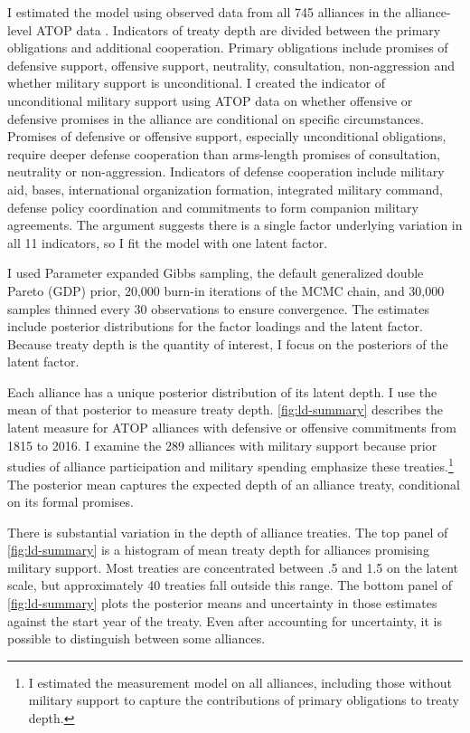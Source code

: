 \documentclass[12pt]{article}
\begin{document}
I estimated the model using observed data from all 745 alliances in the alliance-level ATOP data \citep{Leedsetal2002}. 
Indicators of treaty depth are divided between the primary obligations and additional cooperation.
Primary obligations include promises of defensive support, offensive support, neutrality, consultation, non-aggression and whether military support is unconditional. 
I created the indicator of unconditional military support using ATOP data on whether offensive or defensive promises in the alliance are conditional on specific circumstances. 
Promises of defensive or offensive support, especially unconditional obligations, require deeper defense cooperation than arms-length promises of consultation, neutrality or non-aggression. 
Indicators of defense cooperation include military aid, bases, international organization formation, integrated military command, defense policy coordination and commitments to form companion military agreements. 
The argument suggests there is a single factor underlying variation in all 11 indicators, so I fit the model with one latent factor. 


I used Parameter expanded Gibbs sampling, the default generalized double Pareto (GDP) prior, 20,000 burn-in iterations of the MCMC chain, and 30,000 samples thinned every 30 observations to ensure convergence. 
The estimates include posterior distributions for the factor loadings and the latent factor. 
Because treaty depth is the quantity of interest, I focus on the posteriors of the latent factor. 


Each alliance has a unique posterior distribution of its latent depth. 
I use the mean of that posterior to measure treaty depth. 
\autoref{fig:ld-summary} describes the latent measure for ATOP alliances with defensive or offensive commitments from 1815 to 2016.
I examine the 289 alliances with military support because prior studies of alliance participation and military spending emphasize these treaties.\footnote{
I estimated the measurement model on all alliances, including those without military support to capture the contributions of primary obligations to treaty depth.}
The posterior mean captures the expected depth of an alliance treaty, conditional on its formal promises. 


There is substantial variation in the depth of alliance treaties. 
The top panel of \autoref{fig:ld-summary} is a histogram of mean treaty depth for alliances promising military support.  
Most treaties are concentrated between .5 and 1.5 on the latent scale, but approximately 40 treaties fall outside this range. 
The bottom panel of \autoref{fig:ld-summary} plots the posterior means and uncertainty in those estimates against the start year of the treaty. 
Even after accounting for uncertainty, it is possible to distinguish between some alliances. 
\end{document}
